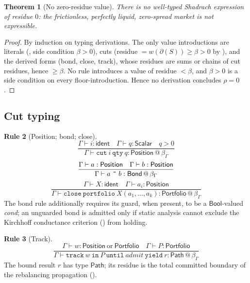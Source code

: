 \documentclass[11pt,a4paper]{article}
\theoremstyle{thmstyle}
\newtheorem{theorem}{Theorem}[section]
\theoremstyle{definition}
\newtheorem{rulename}[theorem]{Rule}
\theoremstyle{remark}
\newcommand{\wt}{w}
\newcommand{\flo}{\beta}
\newcommand{\res}{\rho}
\newcommand{\cut}{\partial}
\newcommand{\sh}[1]{\texttt{#1}}
\begin{document}
\begin{theorem}[No zero-residue value]
\label{thm:no-zero-value}
There is no well-typed Shadrach expression of residue $0$: the
frictionless, perfectly liquid, zero-spread market is not expressible.
\end{theorem}

\begin{proof}
By induction on typing derivations. The only value introductions are
literals (, side condition $\flo>0$), cuts
(residue $=\wt(\cut(S))\ge\flo>0$ by ), and the derived
forms (bond, close, track), whose residues are sums or chains of cut
residues, hence $\ge\flo$. No rule introduces a value of residue
$<\flo$, and $\flo>0$ is a side condition on every floor-introduction.
Hence no derivation concludes $\res=0$.
\end{proof}

\subsection{Cut typing}

\begin{rulename}[Position; bond; close]
\label{rule:verbs}
\[
\frac{\Gamma\vdash i:\mathsf{ident}\quad\Gamma\vdash q:\mathsf{Scalar}\quad q>0}
     {\Gamma\vdash\sh{cut}\ i\ \sh{qty}\ q:\mathsf{Position}\,@\,\flo_\Gamma}
\]
\[
\frac{\Gamma\vdash a:\mathsf{Position}\quad\Gamma\vdash b:\mathsf{Position}}
     {\Gamma\vdash a\ \sh{\~{}}\ b:\mathsf{Bond}\,@\,\flo_\Gamma}
\]
\[
\frac{\Gamma\vdash X:\mathsf{ident}\quad\Gamma\vdash a_i:\mathsf{Position}}
     {\Gamma\vdash\sh{close}\ \sh{portfolio}\ X(a_1,\dots,a_k):\mathsf{Portfolio}\,@\,\flo_\Gamma}
\]
The bond rule additionally requires its guard, when present, to be a
$\mathsf{Bool}$-valued \textit{cond}; an unguarded bond is admitted only
if static analysis cannot exclude the Kirchhoff conductance criterion
() from holding.
\end{rulename}

\begin{rulename}[Track]
\label{rule:track}
\[
\frac{\Gamma\vdash w:\mathsf{Position}\ \text{or}\ \mathsf{Portfolio}\quad
      \Gamma\vdash P:\mathsf{Portfolio}}
     {\Gamma\vdash\sh{track}\ w\ \sh{in}\ P\ \sh{until}\ \textit{admit}\ \sh{yield}\ r
      :\mathsf{Path}\,@\,\flo_\Gamma}
\]
The bound result $r$ has type $\mathsf{Path}$; its residue is the total
committed boundary of the rebalancing propagation
().
\end{rulename}
\end{document}
